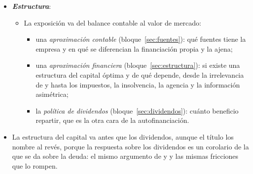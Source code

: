 \documentclass[11pt]{article}
\begin{document}
\begin{itemize}
\item \textbf{\emph{Estructura}}:
  \begin{itemize}
  \item La exposición va del balance contable al valor de mercado:
  \begin{itemize}
  \item una \emph{aproximación contable} (bloque~\ref{sec:fuentes}): qué fuentes tiene la empresa y en qué se diferencian la financiación propia y la ajena;
  \item una \emph{aproximación financiera} (bloque~\ref{sec:estructura}): si existe una estructura del capital óptima y de qué depende, desde la irrelevancia de  y  hasta los impuestos, la insolvencia, la agencia y la información asimétrica;
  \item la \emph{política de dividendos} (bloque~\ref{sec:dividendos}): cuánto beneficio repartir, que es la otra cara de la autofinanciación.
  \end{itemize}
  \end{itemize}
\item La estructura del capital va antes que los dividendos, aunque el título los nombre al revés, porque la respuesta sobre los dividendos es un corolario de la que se da sobre la deuda: el mismo argumento de  y  y las mismas fricciones que lo rompen.
\end{itemize}
\end{document}
